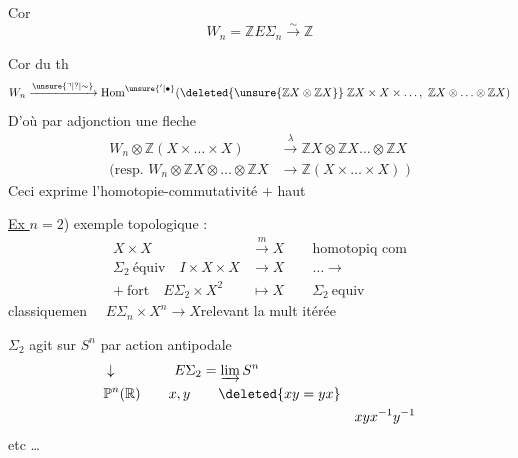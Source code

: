 Cor
\[
W_n=\mathbb ZE\Sigma_n\xrightarrow{\sim}\mathbb Z
\]

Cor du th
\[
W_n\xrightarrow{\unsure{\urcorner|?|\sim}}\mathrm{Hom}^{\unsure{'|\bullet}}(\deleted{\unsure{\mathbb ZX\otimes\mathbb ZX}}\;\mathbb ZX\times X\times\ldots,\ \mathbb ZX\otimes\ldots\otimes\mathbb ZX)
\]
D'où par adjonction une fleche
\[
\begin{aligned}
W_n\otimes\mathbb Z(X\times\ldots\times X)&\xrightarrow{\lambda}\mathbb ZX\otimes\mathbb ZX\ldots\otimes\mathbb ZX\\
(\text{resp. }W_n\otimes\mathbb ZX\otimes\ldots\otimes\mathbb ZX&\longrightarrow\mathbb Z(X\times\ldots\times X)\;)
\end{aligned}
\]
Ceci exprime l'homotopie-commutativité  \(+\) haut

\uline{Ex \(n=2\)}) exemple topologique :
\[
\begin{aligned}
X\times X&\xrightarrow{m} X\qquad\text{homotopiq com}\\
\Sigma_2\ \text{équiv}\quad I\times X\times X&\longrightarrow X \qquad\ldots\longrightarrow\\
+\ \text{fort}\quad E\Sigma_2\times X^2&\longmapsto X\qquad \Sigma_2\ \text{equiv}
\end{aligned}
\]
classiquemen \(\quad E\Sigma_n\times X^n\longrightarrow X\)\quad relevant la mult itérée

\(\Sigma_2\) agit sur \(S^n\) par action antipodale
\[
\begin{aligned}
&\downarrow\hspace{4em} E\Sigma_2=\varinjlim S^n\\
&\mathbb P^n(\mathbb R)\qquad x,y\qquad\deleted{xy=yx}\\
&&xyx^{-1}y^{-1}
\end{aligned}
\]
etc \ldots

